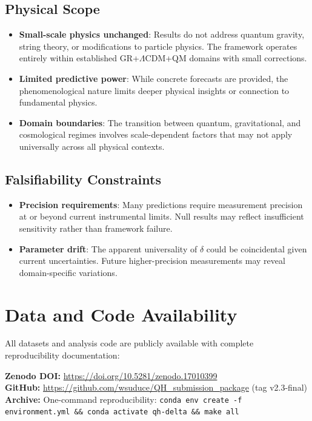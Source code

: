 \documentclass[aps,prd,preprint,onecolumn,nofootinbib,superscriptaddress,longbibliography]{revtex4-2}
\begin{document}
\subsection{Physical Scope}
\begin{itemize}
\item \textbf{Small-scale physics unchanged}: Results do not address quantum gravity, string theory, or modifications to particle physics. The framework operates entirely within established GR+$\Lambda$CDM+QM domains with small corrections.
\item \textbf{Limited predictive power}: While concrete forecasts are provided, the phenomenological nature limits deeper physical insights or connection to fundamental physics.
\item \textbf{Domain boundaries}: The transition between quantum, gravitational, and cosmological regimes involves scale-dependent factors that may not apply universally across all physical contexts.
\end{itemize}

\subsection{Falsifiability Constraints}
\begin{itemize}
\item \textbf{Precision requirements}: Many predictions require measurement precision at or beyond current instrumental limits. Null results may reflect insufficient sensitivity rather than framework failure.
\item \textbf{Parameter drift}: The apparent universality of $\delta$ could be coincidental given current uncertainties. Future higher-precision measurements may reveal domain-specific variations.
\end{itemize}

\section*{Data and Code Availability}

All datasets and analysis code are publicly available with complete reproducibility documentation:

\textbf{Zenodo DOI:} \url{https://doi.org/10.5281/zenodo.17010399}\\
\textbf{GitHub:} \url{https://github.com/wsuduce/QH_submission_package} (tag v2.3-final)\\
\textbf{Archive:} One-command reproducibility: \texttt{conda env create -f environment.yml \&\& conda activate qh-delta \&\& make all}
\end{document}
